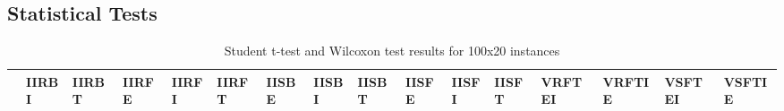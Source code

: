 \documentclass[a4paper,12pt]{article}
\begin{document}
\newpage\cleardoublepage{}
\begin{landscape}
\section{Statistical Tests}
\label{app:stat}
\begin{table}[H]
\begin{center}
\caption{Student t-test and Wilcoxon test results for 100x20 instances}
\label{app:stat/table/100x20}
\tiny
\tabcolsep=0.11cm
\begin{tabular}{|l|l|l|l|l|l|l|l|l|l|l|l|l|l|l|l|}
\hline
& \textbf{IIRBI} & \textbf{IIRBT} & \textbf{IIRFE} & \textbf{IIRFI} & \textbf{IIRFT} & \textbf{IISBE} & \textbf{IISBI} & \textbf{IISBT} & \textbf{IISFE} & \textbf{IISFI} & \textbf{IISFT} & \textbf{VRFTEI} & \textbf{VRFTIE} & \textbf{VSFTEI} & \textbf{VSFTIE}\\
\hline

\end{tabular}
\end{center}
\end{table}
\end{landscape}
\end{document}
